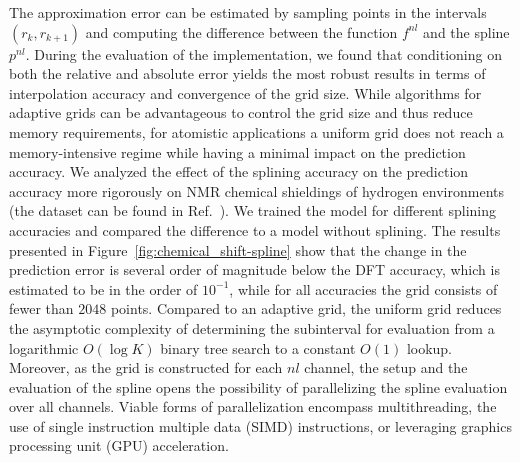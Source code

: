 The approximation error can be estimated by sampling points in the intervals $(r_k, r_{k+1})$ and computing the difference between the function $f^{nl}$ and the spline $p^{nl}$.
During the evaluation of the implementation, we found that conditioning on both the relative and absolute error yields the most robust results in terms of interpolation accuracy and convergence of the grid size.
While algorithms for adaptive grids can be advantageous to control the grid size and thus reduce memory requirements, for atomistic applications a uniform grid does not reach a memory-intensive regime while having a minimal impact on the prediction accuracy.
We analyzed the effect of the splining accuracy on the prediction accuracy more rigorously on NMR chemical shieldings of hydrogen environments (the dataset can be found in Ref.~\cite{paruzzo2018chemical}).
We trained the model for different splining accuracies and compared the difference to a model without splining.
The results presented in Figure~\ref{fig:chemical_shift-spline} show that the change in the prediction error is several order of magnitude below the DFT accuracy, which is estimated to be in the order of $10^{-1}$, while for all accuracies the grid consists of fewer than $2048$ points.
Compared to an adaptive grid, the uniform grid reduces the asymptotic complexity of determining the subinterval for evaluation from a logarithmic $O(\log K)$ binary tree search to a constant $O(1)$ lookup.
Moreover, as the grid is constructed for each $nl$ channel, the setup and the evaluation of the spline opens the possibility of parallelizing the spline evaluation over all channels.
Viable forms of parallelization encompass multithreading, the use of single instruction multiple data (SIMD) instructions, or leveraging graphics processing unit (GPU) acceleration.
